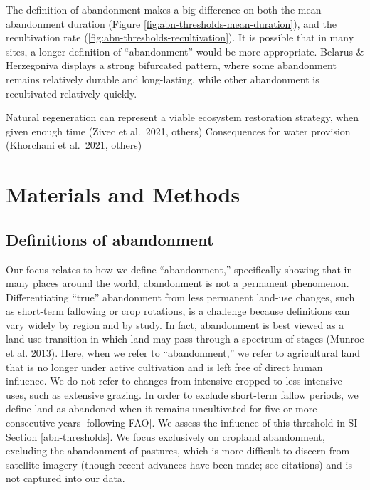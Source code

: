 \documentclass[
]{article}
\begin{document}
The definition of abandonment makes a big difference on both the mean abandonment duration (Figure \ref{fig:abn-thresholds-mean-duration}), and the recultivation rate (\ref{fig:abn-thresholds-recultivation}).
It is possible that in many sites, a longer definition of ``abandonment'' would be more appropriate.
Belarus \& Herzegoniva displays a strong bifurcated pattern, where some abandonment remains relatively durable and long-lasting, while other abandonment is recultivated relatively quickly.

Natural regeneration can represent a viable ecosystem restoration strategy, when given enough time (Zivec et al.~2021, others)
Consequences for water provision (Khorchani et al.~2021, others)

\hypertarget{materials-and-methods}{%
\section{Materials and Methods}\label{materials-and-methods}}

\hypertarget{definitions-of-abandonment}{%
\subsection{Definitions of abandonment}\label{definitions-of-abandonment}}

Our focus relates to how we define ``abandonment,'' specifically showing that in many places around the world, abandonment is not a permanent phenomenon.
Differentiating ``true'' abandonment from less permanent land-use changes, such as short-term fallowing or crop rotations, is a challenge because definitions can vary widely by region and by study.
In fact, abandonment is best viewed as a land-use transition in which land may pass through a spectrum of stages (Munroe et al. 2013).
Here, when we refer to ``abandonment,'' we refer to agricultural land that is no longer under active cultivation and is left free of direct human influence.
We do not refer to changes from intensive cropped to less intensive uses, such as extensive grazing.
In order to exclude short-term fallow periods, we define land as abandoned when it remains uncultivated for five or more consecutive years {[}following FAO{]}.
We assess the influence of this threshold in SI Section \ref{abn-thresholds}.
We focus exclusively on cropland abandonment, excluding the abandonment of pastures, which is more difficult to discern from satellite imagery (though recent advances have been made; see citations) and is not captured into our data.
\end{document}
